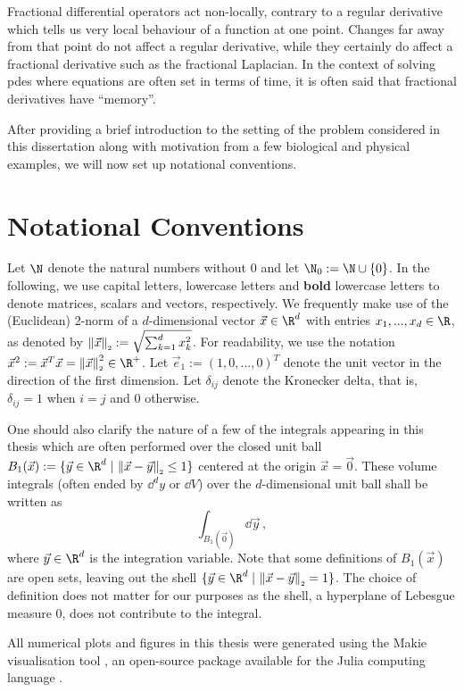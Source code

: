 Fractional differential operators act non-locally, contrary to a regular derivative which tells us very local behaviour of a function at one point.
Changes far away from that point do not affect a regular derivative, while they certainly do affect a fractional derivative such as the fractional Laplacian.
In the context of solving \gls{pdes} where equations are often set in terms of time, it is often said that fractional derivatives have ``memory''.

After providing a brief introduction to the setting of the problem considered in this dissertation along with motivation from a few biological and physical examples, we will now set up notational conventions.

\section{Notational Conventions}
Let $\N$ denote the natural numbers without $0$ and let $\N_0 := \N \cup \{0\}$.
In the following, we use capital letters, lowercase letters and \textbf{bold} lowercase letters to denote matrices, scalars and vectors, respectively.
We frequently make use of the (Euclidean) 2-norm of a $d$-dimensional vector $\vec{x} \in \R^d$ with entries $x_1, ..., x_d \in \R$, as denoted by $\left\lVert\vec{x}\right\rVert_{\scriptscriptstyle 2} := \sqrt{\sum_{k=1}^d x_k^2}$.
For readability, we use the notation $\vec{x}^2 := \vec{x}^T \vec{x} = \norm{\vec{x}}^2 \in \R^+$.
Let $\vec{e}_1 := (1, 0, ..., 0)^T$ denote the unit vector in the direction of the first dimension.
Let $\delta_{ij}$ denote the Kronecker delta, that is, $\delta_{ij} = 1$ when $i=j$ and $0$ otherwise.

One should also clarify the nature of a few of the integrals appearing in this thesis which are often performed over the closed unit ball $B_1(\vec{x}) := \{\vec{y} \in \R^d \;|\, \norm{\vec{x} - \vec{y}} \le 1\}$ centered at the origin $\vec{x} = \vec{0}$.
These volume integrals (often ended by $\dd^d y$ or $\dd V$) over the $d$-dimensional unit ball shall be written as
$$\int_{B_1(\vec{0})} \dd\vec{y}\,,$$
where $\vec{y} \in \R^d$ is the integration variable.
Note that some definitions of $B_1(\vec{x})$ are open sets, leaving out the shell $\{\vec{y} \in \R^d \;|\, \norm{\vec{x} - \vec{y}} = 1\}$.
The choice of definition does not matter for our purposes as the shell, a hyperplane of Lebesgue measure $0$, does not contribute to the integral.

All numerical plots and figures in this thesis were generated using the Makie visualisation tool \parencite{2021-makie}, an open-source package available for the Julia computing language \parencite{2017-julia}.
